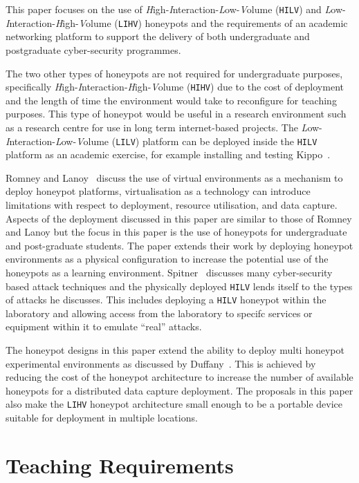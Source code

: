 This paper focuses on the use of \emph{H}igh-\emph{I}nteraction-\emph{L}ow-\emph{V}olume (\texttt{HILV}) and \emph{L}ow-\emph{I}nteraction-\emph{H}igh-\emph{V}olume (\texttt{LIHV}) honeypots and the requirements of an academic networking platform to support the delivery of both undergraduate and postgraduate cyber-security programmes. 

The two other types of honeypots are not required for undergraduate purposes, specifically \emph{H}igh-\emph{I}nteraction-\emph{H}igh-\emph{V}olume (\texttt{HIHV}) due to the cost of deployment and the length of time the environment would take to reconfigure for teaching purposes. This type of honeypot would be useful in a research environment such as a research centre for use in long term internet-based projects. The \emph{L}ow-\emph{I}nteraction-\emph{L}ow-\emph{V}olume (\texttt{LILV}) platform can be deployed inside the \texttt{HILV} platform as an academic exercise, for example installing and testing Kippo~\cite{D:16,SH:15}.

Romney and Lanoy~\cite{LR:06} discuss the use of virtual environments as a mechanism to deploy honeypot platforms, virtualisation as a technology can introduce limitations with respect to deployment, resource utilisation, and data capture. Aspects of the deployment discussed in this paper are similar to those of Romney and Lanoy but the focus in this paper is the use of honeypots for undergraduate and post-graduate students. The paper extends their work by deploying honeypot environments as a physical configuration to increase the potential use of the honeypots as a learning environment. Spitner~\cite{LS:03} discusses many cyber-security based attack techniques and the physically deployed \texttt{HILV} lends itself to the types of attacks he discusses. This includes deploying a \texttt{HILV} honeypot within the laboratory and allowing access from the laboratory to specifc services or equipment within it to emulate ``real'' attacks. 

The honeypot designs in this paper extend the ability to deploy multi honeypot experimental environments as discussed by Duffany~\cite{JD:08}. This is achieved by reducing the cost of the honeypot architecture to increase the number of available honeypots for a distributed data capture deployment. The proposals in this paper also make the \texttt{LIHV} honeypot architecture small enough to be a portable device suitable for deployment in multiple locations.

\section{Teaching Requirements}\label{sec:TeachingRequire}

